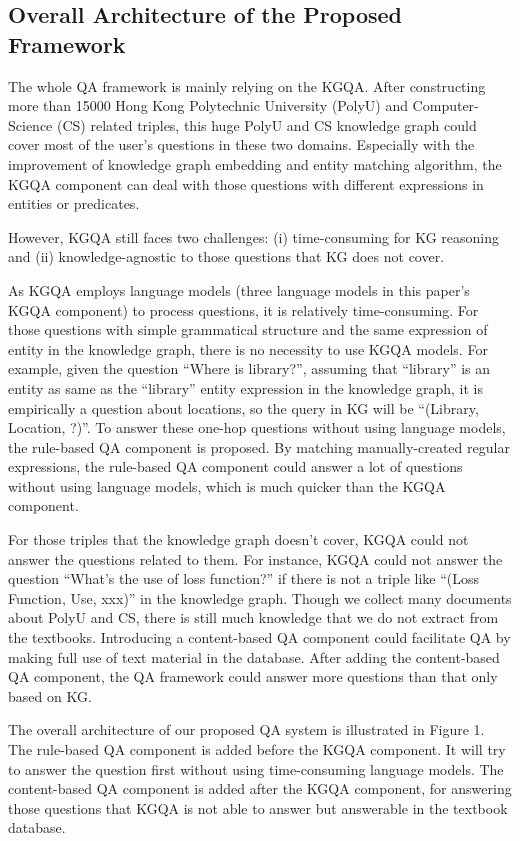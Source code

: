 \documentclass[11pt]{article}
\begin{document}
\subsection{Overall Architecture of the Proposed Framework}
The whole QA framework is mainly relying on the KGQA. After constructing more than 15000 Hong Kong Polytechnic University (PolyU) and Computer-Science (CS) related triples, this huge PolyU and CS knowledge graph could cover most of the user's questions in these two domains. Especially with the improvement of knowledge graph embedding \cite{c9, c11} and entity matching algorithm, the KGQA component can deal with those questions with different expressions in entities or predicates.

However, KGQA still faces two challenges: (i) time-consuming for KG reasoning and (ii) knowledge-agnostic to those questions that KG does not cover.

As KGQA employs language models (three language models in this paper's KGQA component) to process questions, it is relatively time-consuming. For those questions with simple grammatical structure and the same expression of entity in the knowledge graph, there is no necessity to use KGQA models. For example, given the question ``Where is library?'', assuming that ``library'' is an entity as same as the ``library'' entity expression in the knowledge graph, it is empirically a question about locations, so the query in KG will be ``(Library, Location, ?)''. To answer these one-hop questions without using language models, the rule-based QA component is proposed. By matching manually-created regular expressions, the rule-based QA component could answer a lot of questions without using language models, which is much quicker than the KGQA component.

For those triples that the knowledge graph doesn't cover, KGQA could not answer the questions related to them. For instance, KGQA could not answer the question ``What's the use of loss function?'' if there is not a triple like ``(Loss Function, Use, xxx)'' in the knowledge graph. Though we collect many documents about PolyU and CS, there is still much knowledge that we do not extract from the textbooks. Introducing a content-based QA component could facilitate QA by making full use of text material in the database. After adding the content-based QA component, the QA framework could answer more questions than that only based on KG.

The overall architecture of our proposed QA system is illustrated in Figure 1. The rule-based QA component is added before the KGQA component. It will try to answer the question first without using time-consuming language models. The content-based QA component is added after the KGQA component, for answering those questions that KGQA is not able to answer but answerable in the textbook database.
\end{document}
